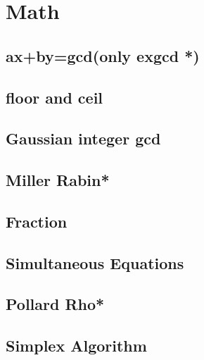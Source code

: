 \section{Math}
\subsection{ax+by=gcd(only exgcd *)} %

\subsection{floor and ceil}

\subsection{Gaussian integer gcd}

% 
\subsection{Miller Rabin*} %

% 
\subsection{Fraction}

\subsection{Simultaneous Equations}

\subsection{Pollard Rho*} %

\subsection{Simplex Algorithm}

